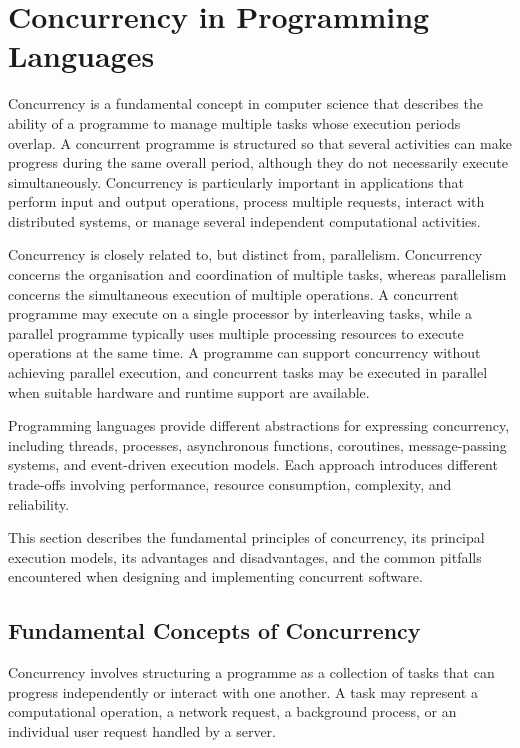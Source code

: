 \section{Concurrency in Programming Languages}

Concurrency is a fundamental concept in computer science that describes the ability of a programme to manage multiple tasks whose execution periods overlap. A concurrent programme is structured so that several activities can make progress during the same overall period, although they do not necessarily execute simultaneously. Concurrency is particularly important in applications that perform input and output operations, process multiple requests, interact with distributed systems, or manage several independent computational activities.

Concurrency is closely related to, but distinct from, parallelism. Concurrency concerns the organisation and coordination of multiple tasks, whereas parallelism concerns the simultaneous execution of multiple operations. A concurrent programme may execute on a single processor by interleaving tasks, while a parallel programme typically uses multiple processing resources to execute operations at the same time. A programme can support concurrency without achieving parallel execution, and concurrent tasks may be executed in parallel when suitable hardware and runtime support are available.

Programming languages provide different abstractions for expressing concurrency, including threads, processes, asynchronous functions, coroutines, message-passing systems, and event-driven execution models. Each approach introduces different trade-offs involving performance, resource consumption, complexity, and reliability.

This section describes the fundamental principles of concurrency, its principal execution models, its advantages and disadvantages, and the common pitfalls encountered when designing and implementing concurrent software.

\subsection{Fundamental Concepts of Concurrency}

Concurrency involves structuring a programme as a collection of tasks that can progress independently or interact with one another. A task may represent a computational operation, a network request, a background process, or an individual user request handled by a server.

